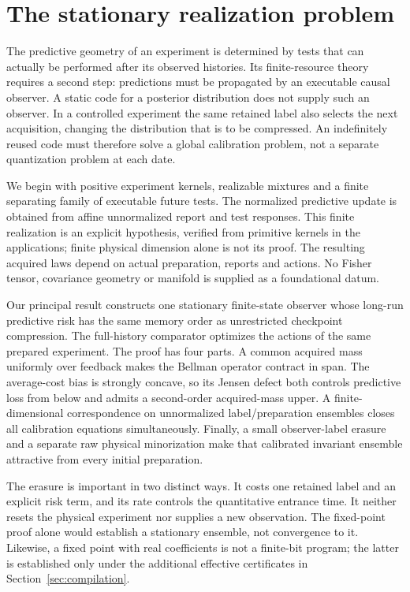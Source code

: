 \section{The stationary realization problem}\label{sec:introduction}
The predictive geometry of an experiment is determined by tests that can actually be performed after its observed histories. Its finite-resource theory requires a second step: predictions must be propagated by an executable causal observer. A static code for a posterior distribution does not supply such an observer. In a controlled experiment the same retained label also selects the next acquisition, changing the distribution that is to be compressed. An indefinitely reused code must therefore solve a global calibration problem, not a separate quantization problem at each date.

We begin with positive experiment kernels, realizable mixtures and a finite separating family of executable future tests. The normalized predictive update is obtained from affine unnormalized report and test responses. This finite realization is an explicit hypothesis, verified from primitive kernels in the applications; finite physical dimension alone is not its proof. The resulting acquired laws depend on actual preparation, reports and actions. No Fisher tensor, covariance geometry or manifold is supplied as a foundational datum.

Our principal result constructs one stationary finite-state observer whose long-run predictive risk has the same memory order as unrestricted checkpoint compression. The full-history comparator optimizes the actions of the same prepared experiment. The proof has four parts. A common acquired mass uniformly over feedback makes the Bellman operator contract in span. The average-cost bias is strongly concave, so its Jensen defect both controls predictive loss from below and admits a second-order acquired-mass upper. A finite-dimensional correspondence on unnormalized label/preparation ensembles closes all calibration equations simultaneously. Finally, a small observer-label erasure and a separate raw physical minorization make that calibrated invariant ensemble attractive from every initial preparation.

The erasure is important in two distinct ways. It costs one retained label and an explicit risk term, and its rate controls the quantitative entrance time. It neither resets the physical experiment nor supplies a new observation. The fixed-point proof alone would establish a stationary ensemble, not convergence to it. Likewise, a fixed point with real coefficients is not a finite-bit program; the latter is established only under the additional effective certificates in Section~\ref{sec:compilation}.

